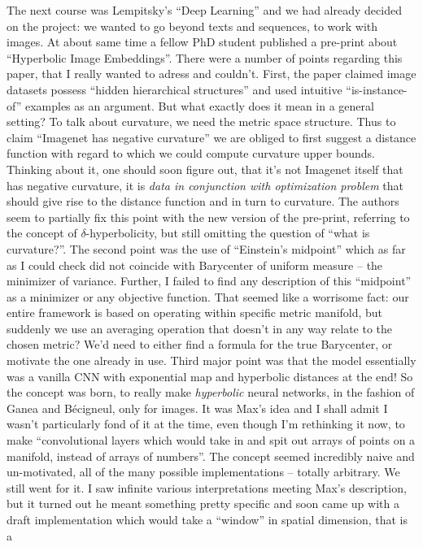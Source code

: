 The next course was Lempitsky's ``Deep Learning'' and we had already decided on
the project: we wanted to go beyond texts and sequences, to work with images.
At about same time a fellow PhD student published a pre-print about
``Hyperbolic Image Embeddings''. There were a number of points regarding this
paper, that I really wanted to adress and couldn't. First, the paper claimed
image datasets possess ``hidden hierarchical structures'' and used intuitive
``is-instance-of'' examples as an argument. But what exactly does it mean in a
general setting? To talk about curvature, we need the metric space structure.
Thus to claim ``Imagenet has negative curvature'' we are obliged to first
suggest a distance function with regard to which we could compute curvature
upper bounds. Thinking about it, one should soon figure out, that it's not
Imagenet itself that has negative curvature, it is \emph{data in conjunction
with optimization problem} that should give rise to the distance function and
in turn to curvature. The authors seem to partially fix this point with the new
version of the pre-print, referring to the concept of \( \delta \)-hyperbolicity,
but still omitting the question of ``what is curvature?''.
The second point was the use of ``Einstein's midpoint''
which as far as I could check did not coincide with Barycenter of uniform
measure -- the minimizer of variance. Further, I failed to find any description
of this ``midpoint'' as a minimizer or any objective function. That seemed like
a worrisome fact: our entire framework is based on operating within specific
metric manifold, but suddenly we use an averaging operation that doesn't in any
way relate to the chosen metric? We'd need to either find a formula for the
true Barycenter, or motivate the one already in use. Third major point was that
the model essentially was a vanilla CNN with exponential map and hyperbolic
distances at the end! So the concept was born, to really make \emph{hyperbolic}
neural networks, in the fashion of Ganea and B\'ecigneul, only for images.
It was Max's idea and I shall admit I wasn't particularly fond of it at the
time, even though I'm rethinking it now, to make ``convolutional layers which
would take in and spit out arrays of points on a manifold, instead of arrays of
numbers''. The concept seemed incredibly naive and un-motivated, all of the
many possible implementations -- totally arbitrary. We still went for it.  I
saw infinite various interpretations meeting Max's description, but it turned
out he meant something pretty specific and soon came up with a draft
implementation which would take a ``window'' in spatial dimension, that is a
